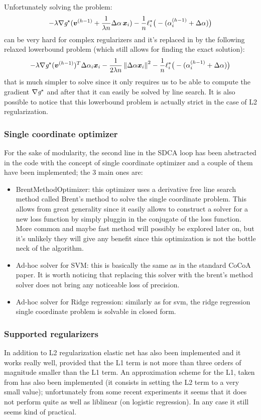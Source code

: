Unfortunately solving the problem:
$$- \lambda \nabla\emph{g}^\star({ \bm{v}^{(h-1)} +\frac{1}{\lambda n} \Delta\alpha\,\bm{x}_i }) - \frac{1}{n}\ell_i^*\big(-(\alpha_i^{(h-1)}+\Delta\alpha)\big)$$
can be very hard for complex regularizers and it's replaced in \cite{ShalevShwartz:2012tn} by the following relaxed
lowerbound problem (which still allows for finding the exact solution):
$$- \lambda \nabla\emph{g}^\star(\bm{v}^{(h-1)})^T \Delta\alpha_i\bm{x}_i - \frac{1}{2 \lambda n} \left\lVert\Delta\alpha\bm{x}_i\right\rVert^2 - \frac{1}{n}\ell_i^*\big(-(\alpha_i^{(h-1)}+\Delta\alpha)\big)$$
that is much simpler to solve since it only requires us to be able to compute the gradient $\nabla \emph{g}^\star$ and after
that it can easily be solved by line search. It is also possible to notice that this lowerbound problem is actually
strict in the case of L2 regularization.

\subsubsection{Single coordinate optimizer}
For the sake of modularity, the second line in the SDCA loop has been abstracted in the code with the concept of
single coordinate optimizer and a couple of them have been implemented; the 3 main ones are:
\begin{itemize}
\item BrentMethodOptimizer: this optimizer uses a derivative free line search method called Brent's method to solve the
single coordinate problem. This allows from great generality since it easily allows to construct a solver for a new
 loss function by simply pluggin in the conjugate of the loss function. More common and maybe fast method will possibly
 be explored later on, but it's unlikely they will give any benefit since this optimization is not the bottle neck of
 the algorithm.
\item Ad-hoc solver for SVM: this is basically the same as in the standard CoCoA paper. It is worth noticing that replacing
this solver with the brent's method solver does not bring any noticeable loss of precision.
\item Ad-hoc solver for Ridge regression: similarly as for svm, the ridge regression single coordinate problem is solvable
in closed form.
\end{itemize}

\subsubsection{Supported regularizers}
In addition to L2 regularization elastic net has also been implemented and it works really well, provided that the L1 term
is not more than three orders of magnitude smaller than the L1 term.
An approximation scheme for the L1, taken from
\cite{ShalevShwartz:2012tn} has also been implemented (it consists in setting the L2 term to a very small value);
unfortunately from some recent experiments it seems that it does not perform quite as well as liblinear (on logistic regression).
In any case it still seems kind of practical.

